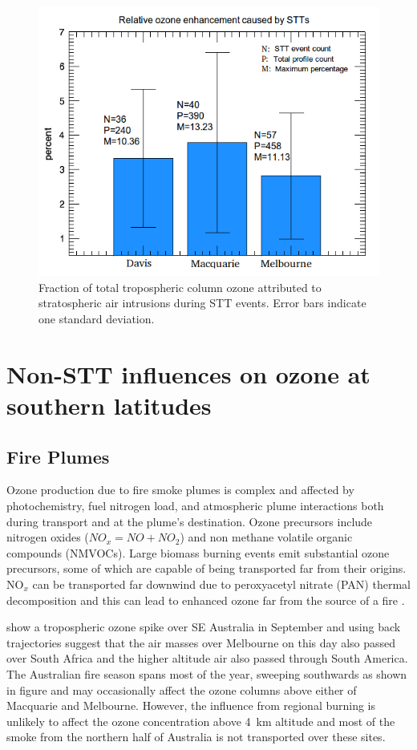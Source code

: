     \begin{figure}[!htbp]
      \includegraphics[width=0.8\columnwidth]{Figures/Ozone/FluxSummary_notrans.png}
      \caption{
      Fraction of total tropospheric column ozone attributed to stratospheric air intrusions during STT events. Error bars indicate one standard deviation.%
      }
      \label{ch_o3:fig:fluxsummary}
    \end{figure}
  

\section{Non-STT influences on ozone at southern latitudes}

  \subsection{Fire Plumes}
    Ozone production due to fire smoke plumes is complex and affected by photochemistry, fuel nitrogen load, and atmospheric plume interactions both during transport and at the plume's destination. Ozone precursors include nitrogen oxides ($NO_x = NO + NO_2$) and non methane volatile organic compounds (NMVOCs). Large biomass burning events emit substantial ozone precursors, some of which are capable of being transported far from their origins. NO$_x$ can be transported far downwind due to peroxyacetyl nitrate (PAN) thermal decomposition and this can lead to enhanced ozone far from the source of a fire \citep{Jaffe_2012}.
    
    \citet{Pak2003} show a tropospheric ozone spike over SE Australia in September and using back trajectories suggest that the air masses over Melbourne on this day also passed over South Africa and the higher altitude air also passed through South America.
    The Australian fire season spans most of the year, sweeping southwards as shown in figure and may occasionally affect the ozone columns above either of Macquarie and Melbourne. However, the influence from regional burning is unlikely to affect the ozone concentration above 4~km altitude and most of the smoke from the northern half of Australia is not transported over these sites.
    
